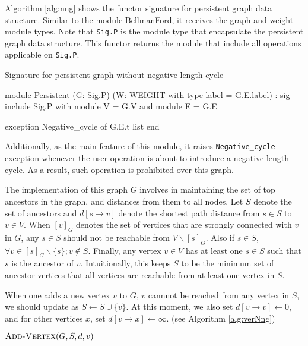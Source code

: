 \documentclass[a4paper,12pt]{article}
\begin{document}
Algorithm \ref{alg:nng} shows the functor signature for persistent
graph data structure. Similar to the module BellmanFord, it receives
the graph and weight module types. Note that \texttt{Sig.P} is the
module type that encapsulate the persistent graph data structure. This
functor returns the module that include all operations applicable on
\texttt{Sig.P}.

\begin{algorithm}
\caption{Signature for persistent graph without negative length cycle}\label{alg:nng}
\begin{ocaml}
module Persistent
  (G: Sig.P)
  (W: WEIGHT with type label = G.E.label) :
sig
  include Sig.P with module V = G.V and module E = G.E

  exception Negative_cycle of G.E.t list
end
\end{ocaml}
\end{algorithm}

Additionally, as the main feature of this module, it raises
\texttt{Negative\_cycle} exception whenever the user operation is
about to introduce a negative length cycle. As a result, such
operation is prohibited over this graph.

The implementation of this graph $G$ involves in maintaining the set
of top ancestors in the graph, and distances from them to all
nodes. Let $S$ denote the set of ancestors and $d[s\to v]$ denote the
shortest path distance from $s\in S$ to $v\in V$. When $[v]_G$ denotes
the set of vertices that are strongly connected with $v$ in $G$, any
$s\in S$ should not be reachable from $V\backslash[s]_G$. Also if
$s\in S$, $\forall v\in[s]_G\backslash\{s\}; v\notin S$. Finally, any
vertex $v\in V$ has at least one $s\in S$ such that $s$ is the
ancestor of $v$. Intuitionally, this keeps $S$ to be the minimum set
of ancestor vertices that all vertices are reachable from at least one
vertex in $S$.

When one adds a new vertex $v$ to $G$, $v$ cannnot be reached from any
vertex in $S$, we should update as $S\leftarrow S\cup\{v\}$. At this
moment, we also set $d[v\to v]\leftarrow 0$, and for other vertices
$x$, set $d[v\to x]\leftarrow \infty$. (see Algorithm
\ref{alg:verNng})

\begin{algorithm}
\caption{$\ensuremath{\mbox{\sc Add-Vertex}}(G,S,d,v)$}\label{alg:verNng}
\begin{algorithmic}[1]
\end{algorithmic}
\end{algorithm}
\end{document}
